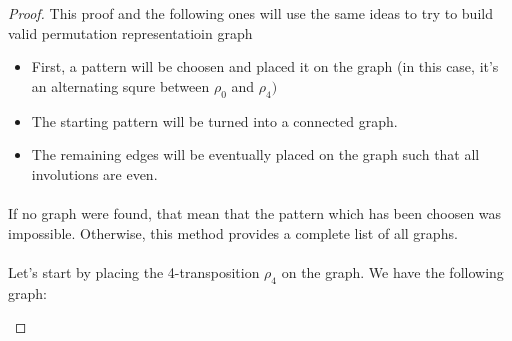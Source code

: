 \begin{proof}
  This proof and the following ones will use the same ideas to try to build valid permutation representatioin graph
  \begin{itemize}
    \item First, a pattern will be choosen and placed it on the graph (in this case, it's an alternating squre between $\rho_0$ and $\rho_4)$
    \item The starting pattern will be turned into a connected graph.
    \item The remaining edges will be eventually placed on the graph such that all involutions are even.
  \end{itemize}

  \paragraph{}
  If no graph were found, that mean that the pattern which has been choosen was impossible. Otherwise, this method provides a complete list of all graphs.

  \paragraph{}
  Let's start by placing the 4-transposition $\rho_4$ on the graph. We have the following graph:

  \begin{figure}[H]
    \begin{center}
\end{center}
\end{figure}
\end{proof}
